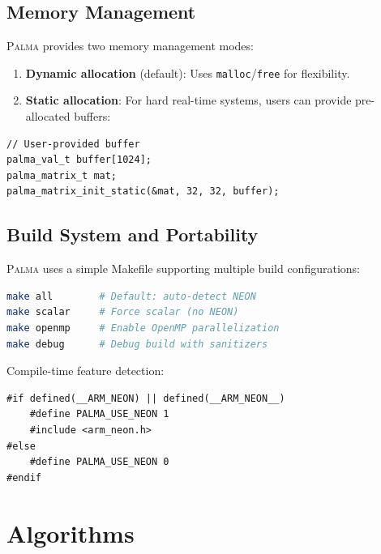 \documentclass[11pt,a4paper]{article}
\theoremstyle{plain}
\theoremstyle{definition}
\newcommand{\palma}{\textsc{Palma}}
\begin{document}
\subsection{Memory Management}

\palma{} provides two memory management modes:

\begin{enumerate}
    \item \textbf{Dynamic allocation} (default): Uses \texttt{malloc}/\texttt{free} for flexibility.
    
    \item \textbf{Static allocation}: For hard real-time systems, users can provide pre-allocated buffers:
\end{enumerate}

\begin{lstlisting}[caption={Static memory allocation mode}]
// User-provided buffer
palma_val_t buffer[1024];
palma_matrix_t mat;
palma_matrix_init_static(&mat, 32, 32, buffer);
\end{lstlisting}

\subsection{Build System and Portability}

\palma{} uses a simple Makefile supporting multiple build configurations:

\begin{lstlisting}[language=bash,caption={Build configurations}]
make all        # Default: auto-detect NEON
make scalar     # Force scalar (no NEON)
make openmp     # Enable OpenMP parallelization
make debug      # Debug build with sanitizers
\end{lstlisting}

Compile-time feature detection:

\begin{lstlisting}[caption={Platform detection}]
#if defined(__ARM_NEON) || defined(__ARM_NEON__)
    #define PALMA_USE_NEON 1
    #include <arm_neon.h>
#else
    #define PALMA_USE_NEON 0
#endif
\end{lstlisting}

\section{Algorithms}
\label{sec:algorithms}
\end{document}
